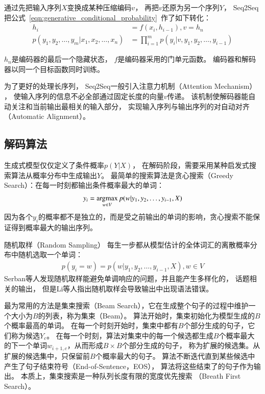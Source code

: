 通过先把输入序列$X$变换成某种压缩编码$v$，
再把$v$还原为另一个序列$Y$，
Seq2Seq把公式~\ref{eqn:generative_conditional_probability}~作了如下转化：
\begin{align}
    h_i &= f(x_i ,h_{i-1}), v = h_n \\
    p(y_1, y_2, \dots, y_m|x_1, x_2, \dots, x_n) &=
    \prod_{i=1}^m p(y_i|v, y_1, y_2, \dots, y_{i-1})
\end{align}

$h_n$是编码器的最后一个隐藏状态， $f$是编码器采用的门单元函数。
编码器和解码器以同一个目标函数同时训练。

为了更好的处理长序列，
Seq2Seq一般引入注意力机制（Attention Mechanism）
，
使输入序列的信息不必全部通过固定长度的向量$v$传递。
该机制使解码器能自动关注和当前输出最相关的输入部分，
实现输入序列与输出序列的对自动对齐（Automatic Alignment）。

\subsection{解码算法}\label{subsec:decode}
生成式模型仅仅定义了条件概率$p(Y|X)$，
在解码阶段，需要采用某种启发式搜索算法从概率分布中生成输出$Y$。
最简单的搜索算法是贪心搜索（Greedy Search）：在每一时刻都输出条件概率最大的单词：
\begin{align}
    y_i = \operatorname*{argmax}_{w \in V} p(w|y_1, y_2, \dots, y_{i-1}, X)
\end{align}
因为各个$y_i$的概率都不是独立的，而是受之前输出的单词的影响，贪心搜索不能保证得到概率最大的输出序列。

随机取样（Random Sampling）
每生一步都从模型估计的全体词汇的离散概率分布中随机选取一个单词：
\begin{align}
    p(y_i = w) = p(w|y_1, y_2, \dots, y_{i-1}, X), w \in V
\end{align}
Serban等人发现随机取样能避免单调响应的问题，并且能产生多样化的，
话题相关的输出，
但是Li等人指出随机取样会导致输出中出现语法错误。

最为常用的方法是集束搜索（Beam Search），它在生成整个句子的过程中维护一个大小为$B$的列表，称为集束（Beam）。
算法开始时，集束初始化为模型生成的$B$个概率最高的单词。
在每一个时刻开始时，集束中都有$B$个部分生成的句子，它们称为候选$Y_c$。
在每一个时刻，算法对集束中的每一个候选都生成$B$个概率最大的下一个单词$w_{i+1, c}$，从而形成$B \times B$个部分生成的句子，
称为扩展的候选集。从扩展的候选集中，只保留前$B$个概率最大的句子。
算法不断迭代直到某些候选中产生了句子结束符号（End-of-Sentence，EOS），
算法将这些结束了的句子作为输出。
本质上，集束搜索是一种队列长度有限的宽度优先搜索
（Breath First Search）。

